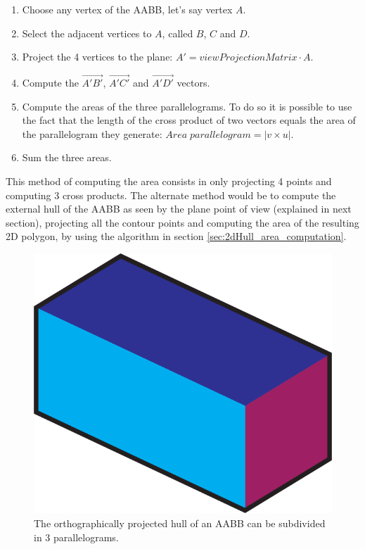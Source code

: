 \documentclass{PoliMi_MasterThesis}
\begin{document}
\begin{enumerate}
	\item Choose any vertex of the AABB, let's say vertex $A$.
	\item Select the adjacent vertices to $A$, called $B$, $C$ and $D$.
	\item Project the 4 vertices to the plane: $A' = viewProjectionMatrix \cdot A$.
	\item Compute the $\overrightarrow{A'B'}$, $\overrightarrow{A'C'}$ and $\overrightarrow{A'D'}$ vectors.
	\item Compute the areas of the three parallelograms. To do so it is possible to use the fact that the length of the cross product of two vectors equals the area of the parallelogram they generate: $Area\; parallelogram = |v \times u|$.
	\item Sum the three areas.
\end{enumerate}

This method of computing the area consists in only projecting 4 points and computing 3 cross products. The alternate method would be to compute the external hull of the AABB as seen by the plane point of view (explained in next section), projecting all the contour points and computing the area of the resulting 2D polygon, by using the algorithm in section \ref{sec:2dHull_area_computation}.

\begin{figure}[H]
    \centering
    \includegraphics[width=\textwidth*\real{0.25}]{Images/three_parallelograms.png}
    \caption{The orthographically projected hull of an AABB can be subdivided in 3 parallelograms.}
    \label{fig:aabb_parallelograms}
\end{figure}
\end{document}
